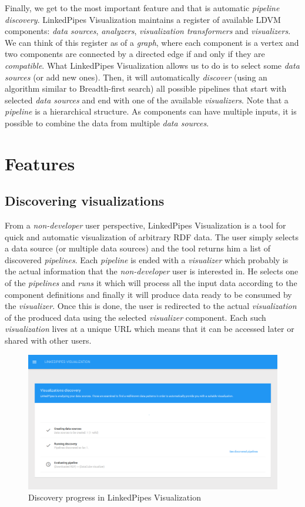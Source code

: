 Finally, we get to the most important feature and that is automatic \emph{pipeline discovery}. LinkedPipes Visualization maintains a register of available LDVM components: \emph{data sources}, \emph{analyzers}, \emph{visualization transformers} and \emph{visualizers}. We can think of this register as of a \emph{graph}, where each component is a vertex and two components are connected by a directed edge if and only if they are \emph{compatible}. What LinkedPipes Visualization allows us to do is to select some \emph{data sources} (or add new ones). Then, it will automatically \emph{discover} (using an algorithm similar to Breadth-first search) all possible pipelines that start with selected \emph{data sources} and end with one of the available \emph{visualizers}. Note that a \emph{pipeline} is a hierarchical structure. As components can have multiple inputs, it is possible to combine the data from multiple \emph{data sources}.

\section{Features}

\subsection{Discovering visualizations}

From a \emph{non-developer} user perspective, LinkedPipes Visualization is a tool for quick and automatic visualization of arbitrary RDF data. The user simply selects a data source (or multiple data sources) and the tool returns him a list of discovered \emph{pipelines}. Each \emph{pipeline} is ended with a \emph{visualizer} which probably is the actual information that the \emph{non-developer} user is interested in. He selects one of the \emph{pipelines} and \emph{runs} it which will process all the input data according to the component definitions and finally it will produce data ready to be consumed by the \emph{visualizer}. Once this is done, the user is redirected to the actual \emph{visualization} of the produced data using the selected \emph{visualizer} component. Each such \emph{visualization} lives at a unique URL which means that it can be accessed later or shared with other users.

\begin{figure}
	\centering
	\includegraphics[width=130mm]{img/03_linked_pipes_discovery.png}
	\caption{Discovery progress in LinkedPipes Visualization} 
	\label{fig:linked-pipes-discovery}
\end{figure}

